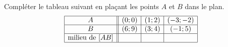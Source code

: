 
\begin{exercice}\label{exosmath-0019}

    Compléter le tableau suivant en plaçant les points \( A\) et \( B\) dans le plan.
    \begin{equation*}
        \begin{array}[]{|c||c|c|c|}
            \hline
            A&(0;0)&(1;2)&(-3;-2)\\
            \hline
            B&(6;9)&(3;4)&(-1;5)\\
            \hline
            \text{milieu de \( [AB]\)}&&&\\
            \hline
        \end{array}
    \end{equation*}

\end{exercice}
